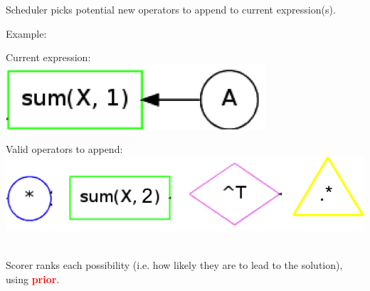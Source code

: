 \documentclass[landscape,a0b]{a0poster_csml_v2}
\begin{document}
\begin{poster}
\begin{PosterColumn}
\vspace{-0.2cm}
\textcolor{anublue}{Scheduler} picks potential new operators to append to current expression(s).

Example:

\begin{minipage}[hc]{0.45\textwidth}
  \centering
  Current expression: \\
  \includegraphics[width=0.5\linewidth]{imgs/current.png}
\end{minipage}
\hfill
\begin{minipage}[hc]{0.45\textwidth}
  \centering
  Valid operators to append:\\
  \includegraphics[width=0.8\linewidth]{imgs/possible.png}
\end{minipage}
\vspace{0.5cm}
\\
\textcolor{mpigreen}{Scorer} ranks each possibility (i.e. how likely they are to lead to the solution), using {\bf \textcolor{red}{prior}}.
\vspace{0.1cm}
\\


\end{PosterColumn}
\end{poster}
\end{document}
